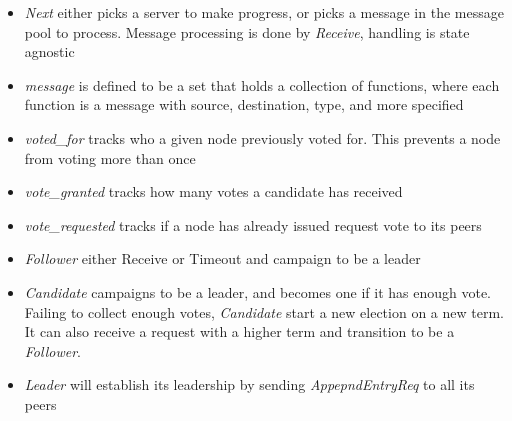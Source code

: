 \begin{tlatex}
\@pvspace{8.0pt}%
%
%
%
%
%
\@pvspace{8.0pt}%
%
%
%
%
%
%
\end{tlatex}

\begin{itemize}
    \item \textit{Next} either picks a server to make progress, or picks a
    message in the message pool to process. Message processing is done by
    \textit{Receive}, handling is state agnostic
    \item \textit{message} is defined to be a set that holds a collection of functions, where 
    each function is a message with source, destination, type, and more specified
    \item \textit{voted\_for} tracks who a given node previously voted for.
    This prevents a node from voting more than once
    \item \textit{vote\_granted} tracks how many votes a candidate has received
    \item \textit{vote\_requested} tracks if a node has already issued request
    vote to its peers
    \item \textit{Follower} either Receive or Timeout and campaign to be a leader
    \item \textit{Candidate} campaigns to be a leader, and becomes one if it has
    enough vote. Failing to collect enough votes, \textit{Candidate} start a new
    election on a new term. It can also receive a request with a higher term and
    transition to be a \textit{Follower}.
    \item \textit{Leader} will establish its leadership by sending
    \textit{AppepndEntryReq} to all its peers
\end{itemize}

